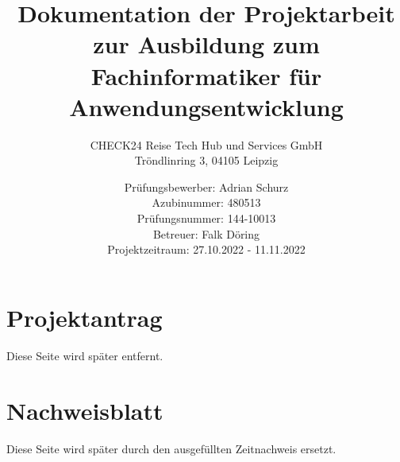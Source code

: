 \documentclass[a4paper,11pt,draft=false,bibliography=totoc]{scrartcl} %
\author{
	Prüfungsbewerber: Adrian Schurz\\
	Azubinummer: 480513\\
	Prüfungsnummer: 144-10013\\
	Betreuer: Falk Döring \\
	Projektzeitraum: 27.10.2022 - 11.11.2022
}
\title{Dokumentation der Projektarbeit zur Ausbildung zum Fachinformatiker für Anwendungsentwicklung}
\subtitle{
	CHECK24 Reise Tech Hub und Services GmbH\\
	Tröndlinring 3, 04105 Leipzig
}
\begin{document}

\titlehead{\centering\texttt{[image: header.png]}}
\maketitle
{}
\newpage

\section{Projektantrag}
\begin{center}
	Diese Seite wird später entfernt.
\end{center}


\section{Nachweisblatt}
\begin{center}
	Diese Seite wird später durch den ausgefüllten Zeitnachweis ersetzt.
\end{center}

\newpage
\tableofcontents
\newpage


















\newpage
\printbibliography

\newpage
\printglossaries
\end{document}
